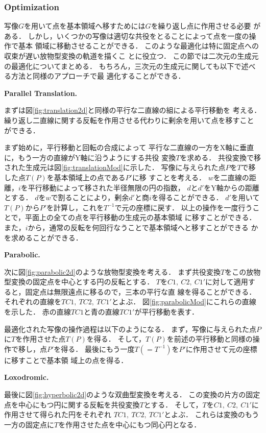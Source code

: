\subsubsection{Optimization}

写像$G$を用いて点を基本領域へ移すためには$G$を繰り返し点に作用させる必要
がある．
しかし，いくつかの写像は適切な共役をとることによって点を一度の操作で基本
領域に移動させることができる．
このような最適化は特に固定点への収束が遅い放物型変換の軌道を描くこ
とに役立つ．
この節では二次元の生成元の最適化についてまとめる．
もちろん，三次元の生成元に関しても以下で述べる方法と同様のアプローチで最
適化することができる．

\noindent\textbf{Parallel Translation.}

まずは図\ref{fig:translation2d}と同様の平行な二直線の組による平行移動を
考える．
繰り返し二直線に関する反転を作用させる代わりに剰余を用いて点を移すこと
ができる．

まず始めに，平行移動と回転の合成によって
平行な二直線の一方をX軸に垂直に，もう一方の直線がY軸に沿うようにする共役
変換$T$を求める．
共役変換で移された生成元は図\ref{fig:translationMod}に示した．
写像に与えられた点$P$を$T$で移した点$T(P)$を基本領域上の点である$P'$に移
すことを考える．
$w$を二直線の距離，$i$を平行移動によって移された半径無限の円の指数，
$d$と$d'$をY軸からの距離とする．
$d$を$w$で割ることにより，剰余$d'$と商$i$を得ることができる．
$d'$を用いて$T(P)$から$P'$を計算し，これを$T^{-1}$で元の座標に戻す．
以上の操作を一度行うことで，平面上の全ての点を平行移動の生成元の基本領域
に移すことができる．
また，$i$から，通常の反転を何回行なうことで基本領域へと移すことができる
かを求めることができる．

\noindent\textbf{Parabolic.}

次に図\ref{fig:parabolic2d}のような放物型変換を考える．
まず共役変換$T$をこの放物型変換の固定点を中心とする円の反転とする．
$T$を$C1,~C2,~C1'$に対して適用すると，固定点は無限遠点に移るので，三本の平行な直
線を得ることができる．
それぞれの直線を$TC1,~TC2,~TC1'$とよぶ．
図\ref{fig:parabolicMod}にこれらの直線を示した．
赤の直線$TC1$と青の直線$TC1'$が平行移動を表す．

最適化された写像の操作過程は以下のようになる．
まず，写像に与えられた点${P}$に$T$を作用させた点$T(P)$を得る．
そして，$T(P)$を前述の平行移動と同様の操作で移し，点$P'$を得る．
最後にもう一度$T(= T^{-1})$を$P'$に作用させて元の座標に移すことで基本領
域上の点を得る．

\noindent\textbf{Loxodromic.}

最後に図\ref{fig:hyperbolic2d}のような双曲型変換を考える．
この変換の片方の固定点を中心にもつ円に関する反転を共役変換$T$とする．
そして，$T$を$C1,~C2,~C1'$に作用させて得られた円をそれぞれ
$TC1,~TC2,~TC1'$とよぶ．
これらは変換のもう一方の固定点に$T$を作用させた点を中心にもつ同心円となる．

